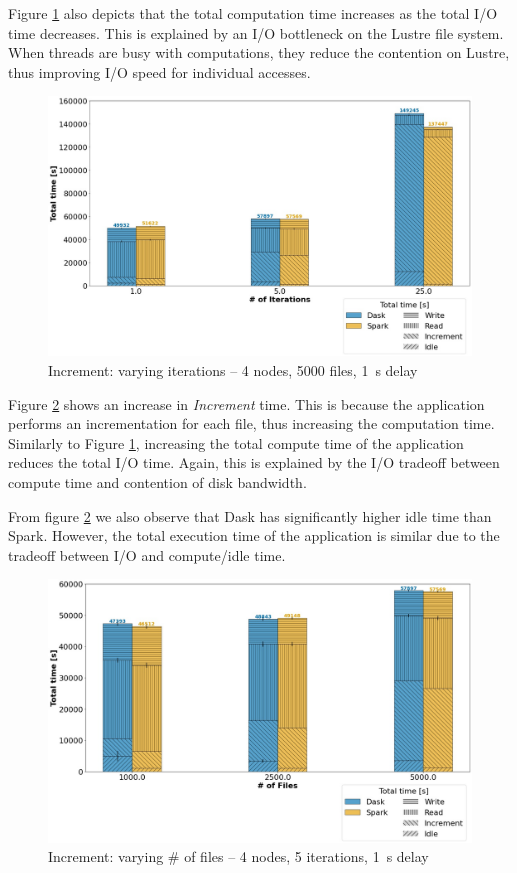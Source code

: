\documentclass[conference]{IEEEtran}
\begin{document}
Figure \ref{fig:increment_itr} also depicts that the total computation time increases as the total I/O time decreases.
This is explained by an I/O bottleneck on the Lustre file system.
When threads are busy with computations, they reduce the contention on Lustre, thus improving I/O speed for individual accesses.
\begin{figure}[!t]
	\centering
	\includegraphics[clip,width=\columnwidth]{figures/stacked_increment_itr.jpg}
	\caption{Increment: varying iterations -- 4 nodes, 5000 files, \SI{1}{\second} delay}
	\label{fig:increment_itr}
\end{figure}
		
Figure \ref{fig:increment_block} shows an increase in \textit{Increment} time.
This is because the application performs an incrementation for each file, thus increasing the computation time.
Similarly to Figure \ref{fig:increment_itr}, increasing the total compute time of the application reduces the total I/O time.
Again, this is explained by the I/O tradeoff between compute time and contention of disk bandwidth.
		
From figure \ref{fig:increment_block} we also observe that Dask has significantly higher idle time than Spark.
However, the total execution time of the application is similar due to the tradeoff between I/O and compute/idle time.
\begin{figure}[!t]
	\centering
	\includegraphics[clip,width=\columnwidth]{figures/stacked_increment_block.jpg}
	\caption{Increment: varying \# of files -- 4 nodes, 5 iterations, \SI{1}{\second} delay}
	\label{fig:increment_block}
\end{figure}
				
\end{document}
